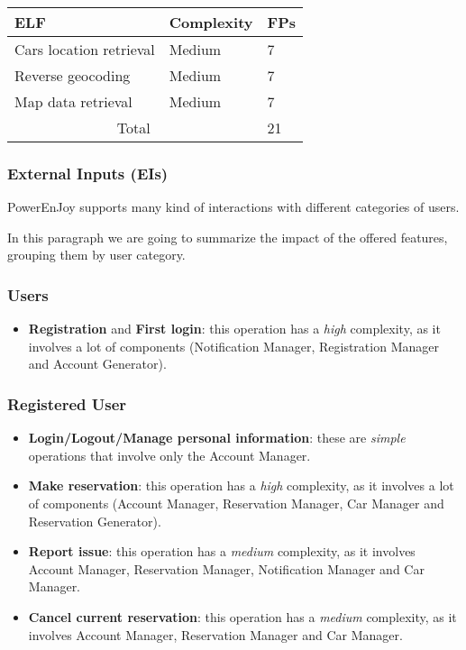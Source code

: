 \begin{table}[H]
	\centering
	\begin{tabular}{| m{4cm} | m{2.5cm} | m{1cm} |}
		\hline
		\textbf{ELF} & \textbf{Complexity} & \textbf{FPs}\\
		\hline
		Cars location retrieval & Medium & 7\\
		Reverse geocoding & Medium & 7\\
		Map data retrieval & Medium & 7\\
		\hline
		\multicolumn{2}{|c|}{Total} & 21\\
		\hline
	\end{tabular}
\end{table}

\subsubsection{External Inputs (EIs)}
PowerEnJoy supports many kind of interactions with different categories of users.

In this paragraph we are going to summarize the impact of the offered features, grouping them by user category.
\subsubsection*{Users}
\begin{itemize}
	\item \textbf{Registration} and \textbf{First login}: this operation has a \textit{high} complexity, as it involves a lot of components (Notification Manager, Registration Manager and Account Generator).
\end{itemize}

\subsubsection*{Registered User}
\begin{itemize}
	\item \textbf{Login/Logout/Manage personal information}: these are \textit{simple} operations that involve only the Account Manager.
	\item \textbf{Make reservation}: this operation has a \textit{high} complexity, as it involves a lot of components (Account Manager, Reservation Manager, Car Manager and Reservation Generator).
	\item \textbf{Report issue}: this operation has a \textit{medium} complexity, as it involves Account Manager, Reservation Manager, Notification Manager and Car Manager.
	\item \textbf{Cancel current reservation}: this operation has a \textit{medium} complexity, as it involves Account Manager, Reservation Manager and Car Manager.
\end{itemize}

